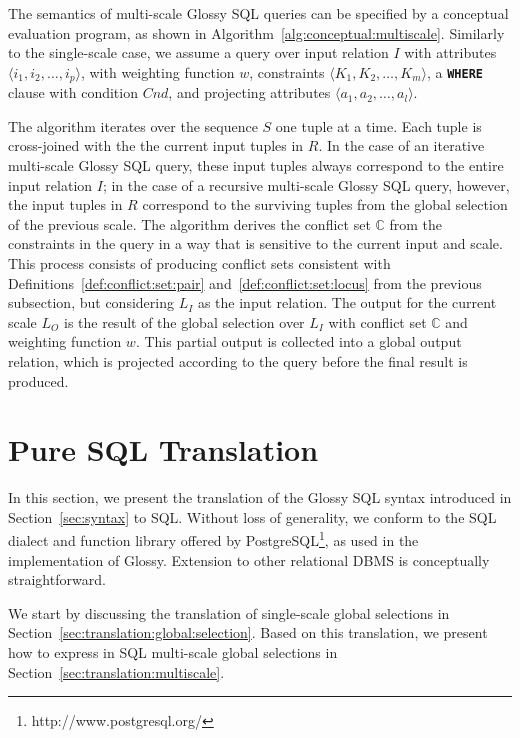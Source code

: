 \documentclass[11pt, oneside]{report}
\begin{document}
The semantics of multi-scale Glossy SQL queries can be specified by a conceptual evaluation program, as shown in Algorithm~\ref{alg:conceptual:multiscale}. Similarly to the single-scale case, we assume a query over input relation $I$ with attributes $\langle i_1, i_2, \ldots, i_p \rangle$, with weighting function $w$, constraints $\langle K_1, K_2, \ldots, K_m\rangle$, a \textbf{\texttt{WHERE}} clause with condition $Cnd$, and projecting attributes $\langle a_1, a_2, \ldots, a_l \rangle$.   


The algorithm iterates over the sequence $S$ one tuple at a time. Each tuple is cross-joined with the the current input tuples in $R$. In the case of an iterative multi-scale Glossy SQL query, these input tuples always correspond to the entire input relation $I$; in the case of a recursive multi-scale Glossy SQL query, however, the input tuples in $R$ correspond to the surviving tuples from the global selection of the previous scale. The algorithm derives the conflict set $\mathbb{C}$ from the constraints in the query in a way that is sensitive to the current input and scale. This process consists of producing conflict sets consistent with Definitions~\ref{def:conflict:set:pair} and~\ref{def:conflict:set:locus} from the previous subsection, but considering $L_I$ as the input relation. The output for the current scale $L_O$ is the result of the global selection over $L_I$ with conflict set $\mathbb{C}$ and weighting function $w$. This partial output is collected into a global output relation, which is projected according to the query before the final result is produced.  

\section{Pure SQL Translation}
\label{sec:sql:translation}

In this section, we present the translation of the Glossy SQL syntax introduced in Section~\ref{sec:syntax} to SQL. Without loss of generality, we conform to the SQL dialect and function library offered by PostgreSQL\footnote{http://www.postgresql.org/}, as used in the implementation of Glossy. Extension to other relational DBMS is conceptually straightforward.  

We start by discussing the translation of single-scale global selections in Section~\ref{sec:translation:global:selection}. Based on this translation, we present how to express in SQL multi-scale global selections in Section~\ref{sec:translation:multiscale}.  
\end{document}
